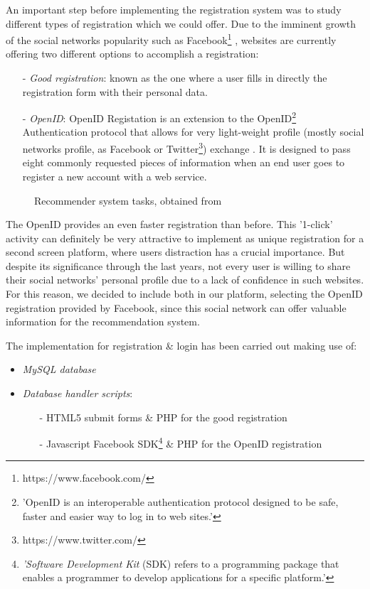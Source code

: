 \documentclass{acm_proc_article-sp}
\begin{document}
An important step before implementing the registration system was to study different types of registration which we could offer. Due to the imminent growth of the social networks popularity such as Facebook\footnote{https://www.facebook.com/} \cite{shih2009facebook}, websites are currently offering two different options to accomplish a registration:

\begin{itemize}
  	\item [-]\textit{Good registration}: known as the one where a user fills in directly the registration form with their personal data. 
	\item [-]\textit{OpenID}: OpenID Registation is an extension to the OpenID\cite{w3c:openid}\footnote{'OpenID is an interoperable authentication protocol designed to be safe, faster and easier way to log in to web sites.'} Authentication protocol that allows for very light-weight profile (mostly social networks profile, as Facebook or Twitter\footnote{https://www.twitter.com/}) exchange . It is designed to pass eight commonly requested pieces of information when an end user goes to register a new account with a web service. 
\end{itemize}\begin{figure}[!htb]
\centering
{}
\caption{Recommender system tasks, obtained from \cite{libbyrecommender}}
\label{fig:recomm}
\end{figure}

The OpenID provides an even faster registration than before. This '1-click' activity can definitely be very attractive to implement as unique registration for a second screen platform\cite{allen2012smashing}, where users distraction has a crucial importance. But despite its significance through the last years, not every user is willing to share their social networks' personal profile due to a lack of confidence in such websites\cite{pu2006trust}. For this reason, we decided to include both in our platform, selecting the OpenID registration provided by Facebook, since this social network can offer valuable information for the recommendation system. 


The implementation for registration \& login has been carried out making use of:

\begin{itemize}
  	\item \textit{MySQL database}
	\item \textit{Database handler scripts}: 
	\begin{itemize}
  		\item [-]HTML5 submit forms \& PHP for the good registration 
		\item [-]Javascript Facebook SDK\cite{web:sdk}\footnote{\textit{'Software Development Kit} (SDK) refers to a programming package that enables a programmer to develop applications for a specific platform.'} \& PHP for the OpenID registration 
	\end{itemize}
\end{itemize}
\end{document}
